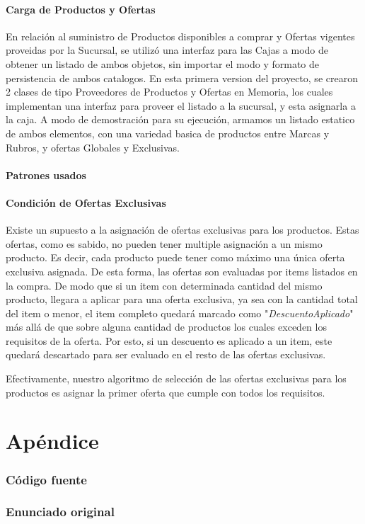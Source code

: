 \documentclass[a4paper,11pt]{article}
\begin{document}
\subsection{Carga de Productos y Ofertas}
En relación al suministro de Productos disponibles a comprar y Ofertas vigentes proveidas por
la Sucursal, se utilizó una interfaz para las Cajas a modo de obtener un listado de ambos objetos, 
sin importar el modo y formato de persistencia de ambos catalogos.
En esta primera version del proyecto, se crearon 2 clases de tipo Proveedores de Productos y Ofertas 
en Memoria, los cuales implementan una interfaz para proveer el listado a la sucursal, y esta 
asignarla a la caja.
A modo de demostración para su ejecución, armamos un listado estatico de ambos elementos, con una 
variedad basica de productos entre Marcas y Rubros, y ofertas Globales y Exclusivas.

\subsection{Patrones usados}


\subsection{Condición de Ofertas Exclusivas}
Existe un supuesto a la asignación de ofertas exclusivas para los productos. 
Estas ofertas, como es sabido, no pueden tener multiple asignación a un mismo producto. 
Es decir, cada producto puede tener como máximo una única oferta exclusiva asignada. 
De esta forma, las ofertas son evaluadas por items listados en la compra. De modo que si un item 
con determinada cantidad del mismo producto, llegara a aplicar para una oferta exclusiva, 
ya sea con la cantidad total del item o menor, el item completo quedará marcado como 
"\textit{DescuentoAplicado}" más allá de que sobre alguna cantidad de productos los cuales exceden
los requisitos de la oferta.
Por esto, si un descuento es aplicado a un item, este quedará descartado para ser evaluado 
en el resto de las ofertas exclusivas.

Efectivamente, nuestro algoritmo de selección de las ofertas exclusivas para los productos 
es asignar la primer oferta que cumple con todos los requisitos.

\clearpage

\part{Apéndice}
\appendix

\section{Código fuente}

\FloatBarrier
\clearpage

\section{Enunciado original}\label{sec:enunciado}

\end{document}
